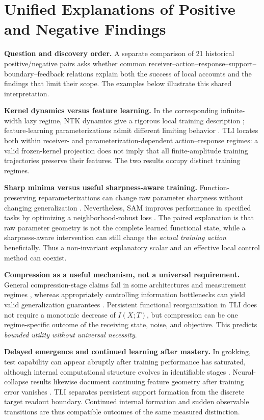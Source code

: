 \documentclass[conference,10pt]{IEEEtran}
\begin{document}
\section{Unified Explanations of Positive and Negative Findings}
\label{sec:unified}
\noindent\textbf{Question and discovery order.}
A separate comparison of 21 historical positive/negative pairs asks whether common receiver--action--response--support--boundary--feedback relations explain both the success of local accounts and the findings that limit their scope. The examples below illustrate this shared interpretation.

\noindent\textbf{Kernel dynamics versus feature learning.}
In the corresponding infinite-width lazy regime, NTK dynamics give a rigorous local training description \cite{jacot2018}; feature-learning parameterizations admit different limiting behavior \cite{yang2021}. TLI locates both within receiver- and parameterization-dependent action--response regimes: a valid frozen-kernel projection does not imply that all finite-amplitude training trajectories preserve their features. The two results occupy distinct training regimes.

\noindent\textbf{Sharp minima versus useful sharpness-aware training.}
Function-preserving reparameterizations can change raw parameter sharpness without changing generalization \cite{dinh2017}. Nevertheless, SAM improves performance in specified tasks by optimizing a neighborhood-robust loss \cite{foret2021}. The paired explanation is that raw parameter geometry is not the complete learned functional state, while a sharpness-aware intervention can still change the \emph{actual training action} beneficially. Thus a non-invariant explanatory scalar and an effective local control method can coexist.

\noindent\textbf{Compression as a useful mechanism, not a universal requirement.}
General compression-stage claims fail in some architectures and measurement regimes \cite{saxe2018}, whereas appropriately controlling information bottlenecks can yield valid generalization guarantees \cite{kawaguchi2023}. Persistent functional reorganization in TLI does not require a monotonic decrease of $I(X;T)$, but compression can be one regime-specific outcome of the receiving state, noise, and objective. This predicts \emph{bounded utility without universal necessity}.

\noindent\textbf{Delayed emergence and continued learning after mastery.}
In grokking, test capability can appear abruptly after training performance has saturated, although internal computational structure evolves in identifiable stages \cite{nanda2023}. Neural-collapse results likewise document continuing feature geometry after training error vanishes \cite{papyan2020}. TLI separates persistent support formation from the discrete target readout boundary. Continued internal formation and sudden observable transitions are thus compatible outcomes of the same measured distinction.
\end{document}
